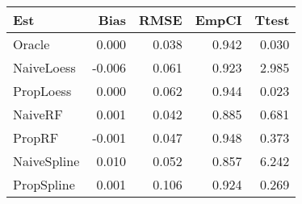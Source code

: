 
\begin{tabular}{lrrrr}
\toprule
Est & Bias & RMSE & EmpCI & Ttest\\
\midrule
Oracle & 0.000 & 0.038 & 0.942 & 0.030\\
NaiveLoess & -0.006 & 0.061 & 0.923 & 2.985\\
PropLoess & 0.000 & 0.062 & 0.944 & 0.023\\
NaiveRF & 0.001 & 0.042 & 0.885 & 0.681\\
PropRF & -0.001 & 0.047 & 0.948 & 0.373\\
NaiveSpline & 0.010 & 0.052 & 0.857 & 6.242\\
PropSpline & 0.001 & 0.106 & 0.924 & 0.269\\
\bottomrule
\end{tabular}